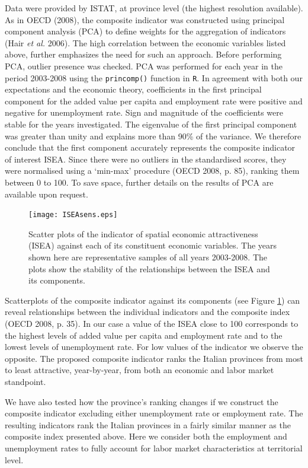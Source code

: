 \documentclass[12pt]{article}
\theoremstyle{definition}
\theoremstyle{plain}
\begin{document}
Data were provided by ISTAT, at province level (the highest resolution available). As in OECD (2008), the composite indicator was constructed using principal component analysis (PCA) to define weights for the aggregation of indicators (Hair \textit{et al.} 2006). The high correlation between the economic variables listed above, further emphasizes the need for such an approach. Before performing PCA, outlier presence was checked. PCA was performed for each year in the period 2003-2008 using the \texttt{princomp()} function in \texttt{R}. In agreement with both our expectations and the economic theory, coefficients in the first principal component for the added value per capita and employment rate were positive and negative for unemployment rate. Sign and magnitude of the coefficients were stable for the years investigated. The eigenvalue of the first principal component was greater than unity and explains more than 90\% of the variance. We therefore conclude that the first component accurately represents the composite indicator of interest ISEA. Since there were no outliers in the standardised scores, they were normalised using a `min-max' procedure (OECD 2008, p. 85), ranking them between 0 to 100. To save space, further details on the results of PCA are available upon request.
  
\begin{figure}[tbp]
\centering
	\texttt{[image: ISEAsens.eps]}
\caption{Scatter plots of the indicator of spatial economic attractiveness (ISEA) against each of its constituent economic variables. The years shown here are representative samples of all years 2003-2008. The plots show the stability of the relationships between the ISEA and its components.}
	\label{fig4}
\end{figure}   
  
Scatterplots of the composite indicator against its components (see Figure \ref{fig4}) can reveal relationships between the individual indicators and the composite index (OECD 2008, p. 35). In our case a value of the ISEA close to 100 corresponds to the highest levels of added value per capita and employment rate and to the lowest levels of unemployment rate. For low values of the indicator we observe the opposite. The proposed composite indicator ranks the Italian provinces from most to least attractive, year-by-year, from both an economic and labor market standpoint.

We have also tested how the province's ranking changes if we construct the composite indicator excluding either unemployment rate or employment rate. The resulting indicators rank the Italian provinces in a fairly similar manner as the composite index presented above. Here we consider both the employment and unemployment rates to fully account for labor market characteristics at territorial level.
\end{document}
